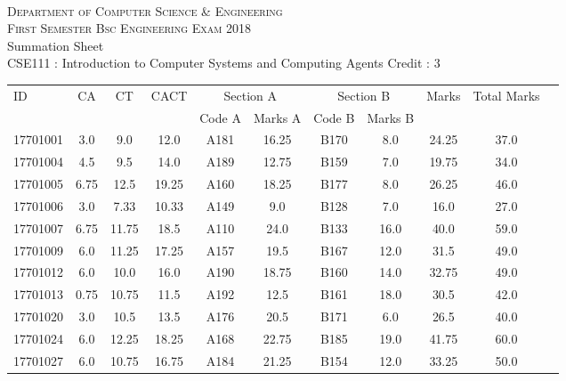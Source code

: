 \documentclass[12pt]{article}
\begin{document}
    \centering
    \begin{minipage}[m]{.8\textwidth} \centering 
	\smallskip
	\\
	\textsc{Department of Computer Science \& Engineering}\\
	\textsc{ First Semester Bsc Engineering Exam 2018}\\
    {\large {\sc Summation Sheet}}\\  
     {\centering CSE111 : Introduction to Computer Systems and Computing Agents     Credit : 3 } \\
    \end{minipage} 
    \begin{center} 
	\renewcommand{\arraystretch}{1.08}
	\begin{small}
    \begin{tabular}{|l|c|c|c|c|c|c|c|c|c|c|} \hline
	\multirow{2}{*}{ID} & 	\multirow{2}{*}{CA}  & 	\multirow{2}{*}{CT}  & 	\multirow{2}{*}{CACT}  & \multicolumn{2 }{c|}{Section A}& \multicolumn{2 }{c|}{Section B} & 	\multirow{2}{*}{Marks}  & 	\multirow{2}{*}{Total Marks}  \\ 
	&  &  &  & Code A & Marks A & Code B & Marks B&  &  \\ \hline
17701001 & 3.0 & 9.0 & 12.0 & A181 & 16.25 & B170 & 8.0 & 24.25 & 37.0\\ \hline 
17701004 & 4.5 & 9.5 & 14.0 & A189 & 12.75 & B159 & 7.0 & 19.75 & 34.0\\ \hline 
17701005 & 6.75 & 12.5 & 19.25 & A160 & 18.25 & B177 & 8.0 & 26.25 & 46.0\\ \hline 
17701006 & 3.0 & 7.33 & 10.33 & A149 & 9.0 & B128 & 7.0 & 16.0 & 27.0\\ \hline 
17701007 & 6.75 & 11.75 & 18.5 & A110 & 24.0 & B133 & 16.0 & 40.0 & 59.0\\ \hline 
17701009 & 6.0 & 11.25 & 17.25 & A157 & 19.5 & B167 & 12.0 & 31.5 & 49.0\\ \hline 
17701012 & 6.0 & 10.0 & 16.0 & A190 & 18.75 & B160 & 14.0 & 32.75 & 49.0\\ \hline 
17701013 & 0.75 & 10.75 & 11.5 & A192 & 12.5 & B161 & 18.0 & 30.5 & 42.0\\ \hline 
17701020 & 3.0 & 10.5 & 13.5 & A176 & 20.5 & B171 & 6.0 & 26.5 & 40.0\\ \hline 
17701024 & 6.0 & 12.25 & 18.25 & A168 & 22.75 & B185 & 19.0 & 41.75 & 60.0\\ \hline 
17701027 & 6.0 & 10.75 & 16.75 & A184 & 21.25 & B154 & 12.0 & 33.25 & 50.0\\ \hline 

\end{tabular}
\end{small}
\end{center}
\end{document}
